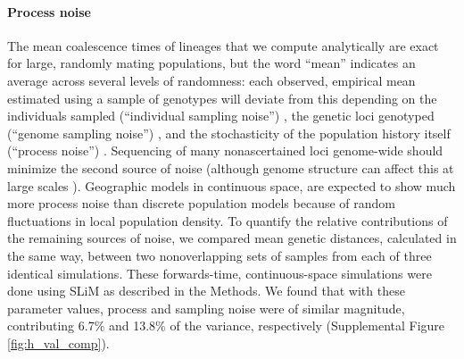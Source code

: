 \documentclass{article}
\begin{document}
\paragraph{Process noise}
The mean coalescence times of lineages that we compute analytically
are exact for large, randomly mating populations,
but the word ``mean'' indicates an average across several levels of randomness:
each observed, empirical mean estimated using a sample of genotypes
will deviate from this depending on the individuals sampled (``individual sampling noise'')
\citep{ashander2018demographic},
the genetic loci genotyped (``genome sampling noise'') \citep{waples2009modelling},
and the stochasticity of the population history itself (``process noise'')
\citep{wakeley2012genealogies,waples2009modelling}.
Sequencing of many nonascertained loci genome-wide should minimize the second source of noise
(although genome structure can affect this at large scales \citep{li2016local}). 
Geographic models in continuous space, 
are expected to show much more process noise than discrete population models
because of random fluctuations in local population density. 
To quantify the relative contributions of the remaining sources of noise,
we compared mean genetic distances, calculated in the same way,
between two nonoverlapping sets of samples from each of three identical simulations.
These forwards-time, continuous-space simulations were done using SLiM as described in the Methods.
We found that with these parameter values, process and sampling noise were of similar magnitude,
contributing 6.7\% and 13.8\% of the variance, respectively
(Supplemental Figure \ref{fig:h_val_comp}).
\end{document}
